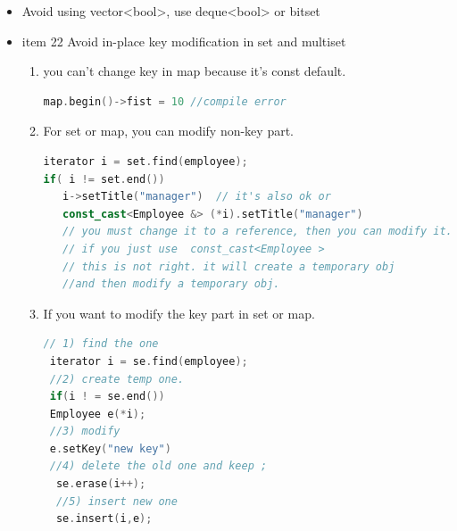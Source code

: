 \documentclass[a4paper,11pt,twoside]{book}
\begin{document}
\begin{itemize}
\item Avoid using vector<bool>, use deque<bool> or bitset


\item item 22 Avoid in-place key modification in set and multiset
\begin{enumerate}
   \item you can't change key in map because it's const default.
\begin{lstlisting}[frame=single, language=c++]
map.begin()->fist = 10 //compile error
\end{lstlisting}

   \item For set or map, you can modify non-key part.
\begin{lstlisting}[frame=single, language=c++]
iterator i = set.find(employee);
if( i != set.end())
   i->setTitle("manager")  // it's also ok or
   const_cast<Employee &> (*i).setTitle("manager")
   // you must change it to a reference, then you can modify it.
   // if you just use  const_cast<Employee >
   // this is not right. it will create a temporary obj
   //and then modify a temporary obj.
\end{lstlisting}

\item If you want to modify the key part in set or map.
\begin{lstlisting}[frame=single, language=c++]
 // 1) find the one
 iterator i = se.find(employee);
 //2) create temp one.
 if(i ! = se.end())
 Employee e(*i);
 //3) modify
 e.setKey("new key")
 //4) delete the old one and keep ;
  se.erase(i++);
  //5) insert new one
  se.insert(i,e);
\end{lstlisting}
    \end{enumerate}


\end{itemize}
\end{document}
